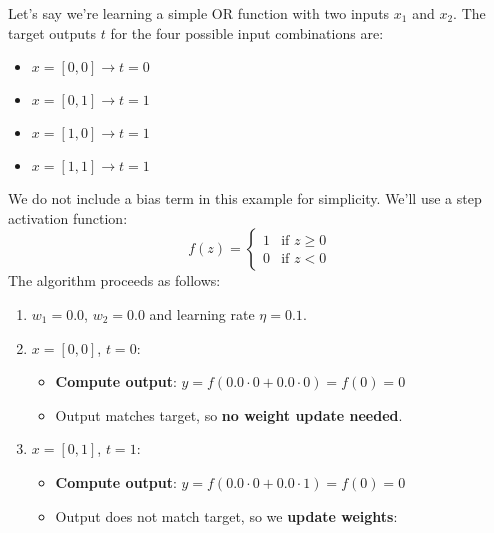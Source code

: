 \newpage

\begin{examplebox}
    Let's say we're learning a simple OR function with two inputs $x_1$ and $x_2$. The target outputs $t$ for the four possible input combinations are:
    \begin{multicols}{2}
        \begin{itemize}
            \item $x = [0, 0] \rightarrow t = 0$
            \item $x = [0, 1] \rightarrow t = 1$
            \item $x = [1, 0] \rightarrow t = 1$
            \item $x = [1, 1] \rightarrow t = 1$
        \end{itemize}
    \end{multicols}
    We do not include a bias term in this example for simplicity. We'll use a step activation function:
    \begin{equation*}
        f(z) = \begin{cases}
            1 & \text{if } z \geq 0 \\
            0 & \text{if } z < 0
        \end{cases}
    \end{equation*}
    The algorithm proceeds as follows:
    \begin{enumerate}
        \item {} $w_1 = 0.0$, $w_2 = 0.0$ and learning rate $\eta = 0.1$.
        \item {} $x = [0, 0]$, $t = 0$:
        \begin{itemize}
            \item[\faIcon{cogs}] \textbf{Compute output}: $y = f(0.0 \cdot 0 + 0.0 \cdot 0) = f(0) = 0$
            \item[\textcolor{Green3}{\faIcon{check-circle}}] Output matches target, so \textbf{no weight update needed}.
        \end{itemize}
        \item {} $x = [0, 1]$, $t = 1$:
        \begin{itemize}
            \item[\faIcon{cogs}] \textbf{Compute output}: $y = f(0.0 \cdot 0 + 0.0 \cdot 1) = f(0) = 0$
            \item[\textcolor{Red2}{\faIcon{times-circle}}] Output does not match target, so we \textbf{update weights}:

\end{itemize}
\end{enumerate}
\end{examplebox}

